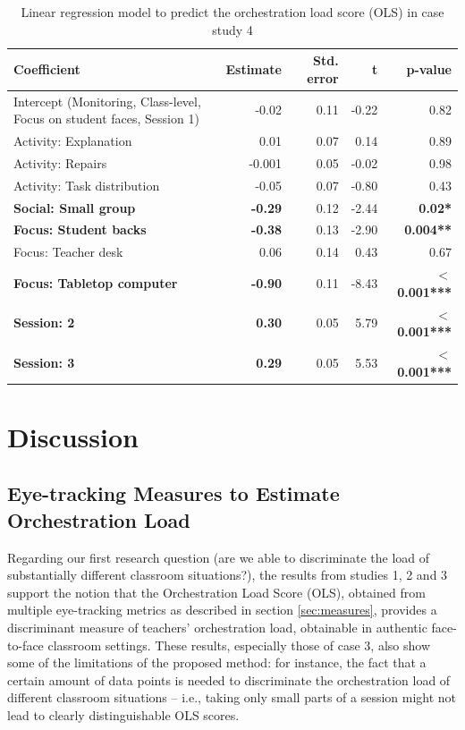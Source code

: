 \documentclass[10pt,journal,compsoc]{IEEEtran}
\begin{document}
\begin{table}[!t]
\caption{Linear regression model to predict the orchestration load score (OLS) in case study 4}
\label{tab:case4results}
\centering
\begin{tabular}{|p{2.6cm}||r|r|r|r|}
\hline
Coefficient & Estimate & Std. error & t & p-value\\
\hline
\hline
Intercept (Monitoring, Class-level, Focus on student faces, Session 1) & -0.02 & 0.11 & -0.22 & 0.82\\
Activity: Explanation & 0.01 & 0.07 & 0.14 & 0.89\\
Activity: Repairs & -0.001 & 0.05 & -0.02 & 0.98\\
Activity: Task distribution & -0.05 & 0.07 & -0.80 & 0.43\\
\textbf{Social: Small group} & \textbf{-0.29} & 0.12 & -2.44 & \textbf{0.02*}\\
\textbf{Focus: Student backs} & \textbf{-0.38} & 0.13 & -2.90 & \textbf{0.004**}\\
Focus: Teacher desk & 0.06 & 0.14 & 0.43 & 0.67\\
\textbf{Focus: Tabletop computer} & \textbf{-0.90} & 0.11 & -8.43 & \textbf{$<$0.001***}\\
\textbf{Session: 2} & \textbf{0.30} & 0.05 & 5.79 & \textbf{$<$0.001***}\\
\textbf{Session: 3} & \textbf{0.29} & 0.05 & 5.53 & \textbf{$<$0.001***}\\
\hline
\end{tabular}
\end{table}


\section{Discussion}
\label{sec:discussion}

\subsection{Eye-tracking Measures to Estimate Orchestration Load}

Regarding our first research question (are we able to discriminate the load of substantially different classroom situations?), the results from studies 1, 2 and 3 support the notion that the Orchestration Load Score (OLS), obtained from multiple eye-tracking metrics as described in section \ref{sec:measures}, provides a discriminant measure of teachers' orchestration load, obtainable in authentic face-to-face classroom settings. These results, especially those of case 3, also show some of the limitations of the proposed method: for instance, the fact that a certain amount of data points is needed to discriminate the orchestration load of different classroom situations -- i.e., taking only small parts of a session might not lead to clearly distinguishable OLS scores.
\end{document}
